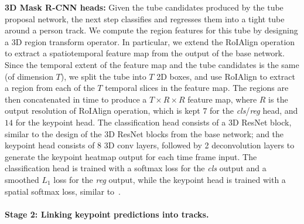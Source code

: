 \documentclass[10pt,twocolumn,letterpaper]{article}
\newcommand{\MODEL}[0]{3D Mask R-CNN}
\begin{document}
{\noindent \bf \MODEL{} heads:}
Given the tube candidates produced by the tube proposal network, the next step classifies and regresses them into a tight tube around a person track.
We compute the region features for this tube by designing a 3D region transform operator. In particular, we extend the RoIAlign
operation~\cite{he2017mask} to extract a spatiotemporal feature map from the output of the base network.
Since the temporal extent of the feature map and the tube candidates is the same (of dimension $T$), we split the tube
into $T$ 2D boxes, and use RoIAlign to extract a region from each of the $T$ temporal slices in the feature map. The regions are then
concatenated in time to produce a $T\times R\times R$ feature map, where $R$ is the output resolution of RoIAlign
operation, which is kept $7$ for the {\em cls}/{\em reg} head, and $14$ for the keypoint head.
The classification head consists of a 3D ResNet block, similar to the design of the 3D ResNet blocks from the base network; and the 
keypoint head consists of 8 3D conv layers, followed by 2 deconvolution layers to generate the keypoint heatmap
output for each time frame input. The classification head is trained with a softmax loss for the {\em cls} output and a smoothed $L_1$ loss for the {\em reg} output, while the 
keypoint head is trained with a spatial softmax loss, similar to~\cite{he2017mask}.


\paragraph{Stage 2: Linking keypoint predictions into tracks.}\label{sec:approach:stage2}
\end{document}
